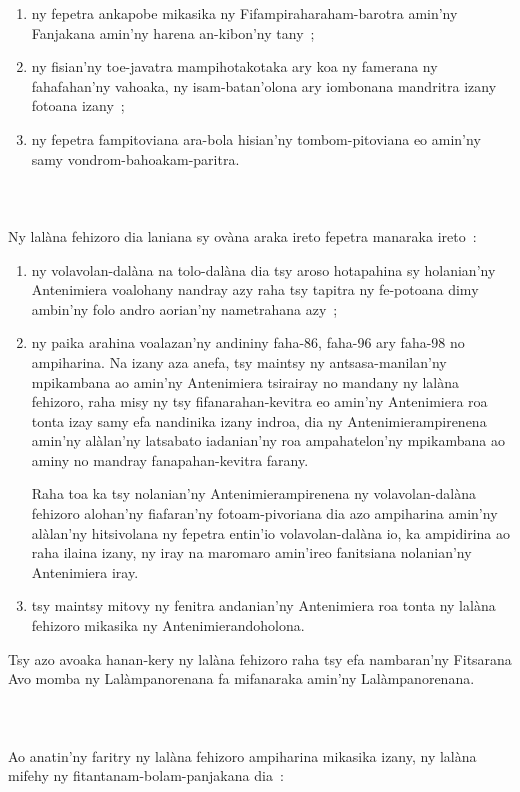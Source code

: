 \documentclass[12pt]{article}
\newcounter{laharana}
\newcommand{\andininy}[0]{
  \paragraph{%
    \NoCaseChange{%
      Andininy~\addtocounter{laharana}{1}\thelaharana.}\label{and:\thelaharana}~%
  }%
}
\begin{document}
\begin{enumerate}
\item ny fepetra ankapobe mikasika ny Fifampiraharaham-barotra amin'ny Fanjakana
  amin'ny harena an-kibon'ny tany~;

\item ny fisian'ny toe-javatra mampihotakotaka ary koa ny famerana ny
  fahafahan'ny vahoaka, ny isam-batan'olona ary iombonana mandritra izany
  fotoana izany~;

\item ny fepetra fampitoviana ara-bola hisian'ny tombom-pitoviana eo amin'ny
  samy vondrom-bahoakam-paritra.
\end{enumerate}


\andininy{}Ny lalàna fehizoro dia laniana sy ovàna araka ireto fepetra
manaraka ireto~:
\begin{enumerate}
\item ny volavolan-dalàna na tolo-dalàna dia tsy aroso hotapahina sy holanian'ny
  Antenimiera voalohany nandray azy raha tsy tapitra ny fe-potoana dimy ambin'ny
  folo andro aorian'ny nametrahana azy~;

\item ny paika arahina voalazan'ny andininy faha-86, faha-96 ary faha-98 no
  ampiharina. Na izany aza anefa, tsy maintsy ny antsasa-manilan'ny mpikambana
  ao amin'ny Antenimiera tsirairay no mandany ny lalàna fehizoro, raha misy ny
  tsy fifanarahan-kevitra eo amin'ny Antenimiera roa tonta izay samy efa
  nandinika izany indroa, dia ny Antenimierampirenena amin'ny alàlan'ny
  latsabato iadanian'ny roa ampahatelon'ny mpikambana ao aminy no mandray
  fanapahan-kevitra farany.

  Raha toa ka tsy nolanian'ny Antenimierampirenena ny volavolan-dalàna fehizoro
  alohan'ny fiafaran'ny fotoam-pivoriana dia azo ampiharina amin'ny alàlan'ny
  hitsivolana ny fepetra entin'io volavolan-dalàna io, ka ampidirina ao raha
  ilaina izany, ny iray na maromaro amin'ireo fanitsiana nolanian'ny Antenimiera
  iray.

\item tsy maintsy mitovy ny fenitra andanian'ny Antenimiera roa tonta ny lalàna
  fehizoro mikasika ny Antenimierandoholona.
\end{enumerate}
\noindent
Tsy azo avoaka hanan-kery ny lalàna fehizoro raha tsy efa nambaran'ny Fitsarana
Avo momba ny Lalàmpanorenana fa mifanaraka amin'ny Lalàmpanorenana.

\andininy{}Ao anatin'ny faritry ny lalàna fehizoro ampiharina mikasika izany, ny
lalàna mifehy ny fitantanam-bolam-panjakana dia~:
\end{document}
